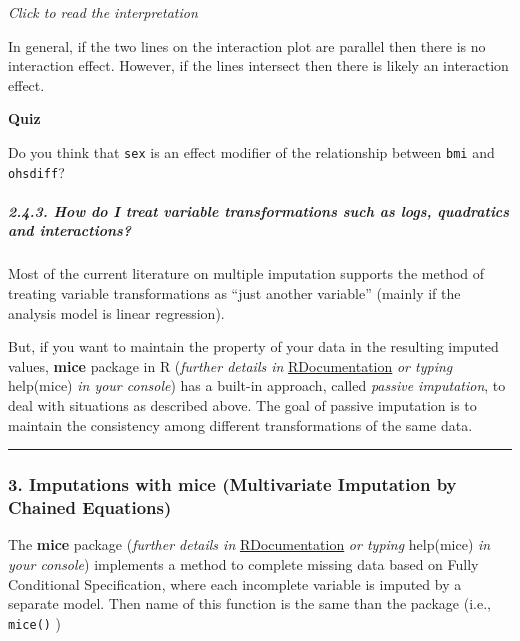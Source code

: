 \documentclass[
]{article}
\begin{document}
\emph{Click to read the interpretation}

In general, if the two lines on the interaction plot are parallel then
there is no interaction effect. However, if the lines intersect then
there is likely an interaction effect.

\textbf{Quiz}

Do you think that \texttt{sex} is an effect modifier of the relationship
between \texttt{bmi} and \texttt{ohsdiff}?

\hypertarget{how-do-i-treat-variable-transformations-such-as-logs-quadratics-and-interactions}{%
\subparagraph{\texorpdfstring{2.4.3. \textbf{How do I treat variable
transformations such as logs, quadratics and
interactions?}}{2.4.3. How do I treat variable transformations such as logs, quadratics and interactions?}}\label{how-do-i-treat-variable-transformations-such-as-logs-quadratics-and-interactions}}

Most of the current literature on multiple imputation supports the
method of treating variable transformations as ``just another variable''
(mainly if the analysis model is linear regression).

But, if you want to maintain the property of your data in the resulting
imputed values, \textbf{mice} package in R (\emph{further details in}
\href{https://www.rdocumentation.org/packages/mice/versions/3.14.0/topics/mice}{RDocumentation}
\emph{or typing} help(mice) \emph{in your console}) has a built-in
approach, called \emph{passive imputation}, to deal with situations as
described above. The goal of passive imputation is to maintain the
consistency among different transformations of the same data.

\begin{center}\rule{0.5\linewidth}{0.5pt}\end{center}

\hypertarget{imputations-with-mice-multivariate-imputation-by-chained-equations}{%
\subsubsection{3. Imputations with mice (Multivariate Imputation by
Chained
Equations)}\label{imputations-with-mice-multivariate-imputation-by-chained-equations}}

The \textbf{mice} package (\emph{further details in}
\href{https://www.rdocumentation.org/packages/mice/versions/3.14.0/topics/mice}{RDocumentation}
\emph{or typing} help(mice) \emph{in your console}) implements a method
to complete missing data based on Fully Conditional Specification, where
each incomplete variable is imputed by a separate model. Then name of
this function is the same than the package (i.e., \texttt{mice()} )
\end{document}

